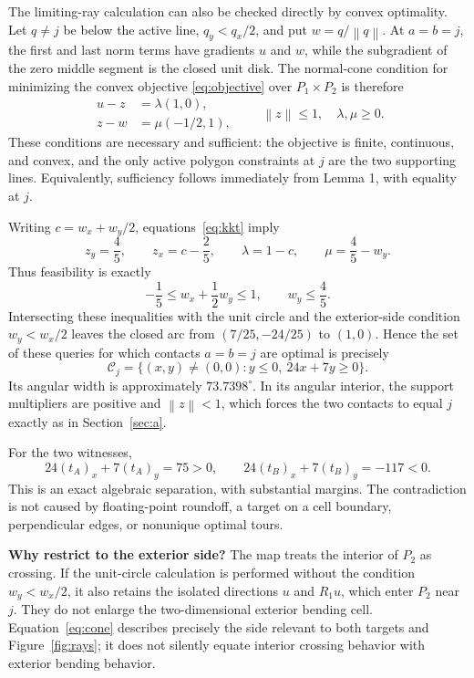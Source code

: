 \documentclass[11pt,a4paper]{article}
\newcommand{\norm}[1]{\left\lVert#1\right\rVert}
\begin{document}
The limiting-ray calculation can also be checked directly by convex optimality.
Let $q\neq j$ be below the active line, $q_y<q_x/2$, and put
$w=q/\norm{q}$. At $a=b=j$, the first and last norm terms have gradients $u$
and $w$, while the subgradient of the zero middle segment is the closed unit
disk. The normal-cone condition for minimizing the convex objective
\eqref{eq:objective} over $P_1\times P_2$ is therefore
\begin{equation}
 \begin{split}
 u-z&=\lambda(1,0),\\
 z-w&=\mu(-1/2,1),
 \end{split}
 \qquad \norm{z}\leq1,\quad \lambda,\mu\geq0.
 \label{eq:kkt}
\end{equation}
These conditions are necessary and sufficient: the objective is finite,
continuous, and convex, and the only active polygon constraints at $j$ are the
two supporting lines. Equivalently, sufficiency follows immediately from
Lemma 1, with equality at $j$.

Writing $c=w_x+w_y/2$, equations~\eqref{eq:kkt} imply
\begin{equation}
 z_y=\frac45,\qquad z_x=c-\frac25,\qquad
 \lambda=1-c,\qquad\mu=\frac45-w_y.
\end{equation}
Thus feasibility is exactly
\begin{equation}
 -\frac15\leq w_x+\frac12w_y\leq1,\qquad w_y\leq\frac45.
 \label{eq:unit-conditions}
\end{equation}
Intersecting these inequalities with the unit circle and the exterior-side
condition $w_y<w_x/2$ leaves the closed arc from
$(7/25,-24/25)$ to $(1,0)$. Hence the set of these queries for which contacts
$a=b=j$ are optimal is precisely
\begin{equation}
 \boxed{\mathcal C_j=\{(x,y)\neq(0,0):y\leq0,\ 24x+7y\geq0\}}.
 \label{eq:cone}
\end{equation}
Its angular width is approximately $73.7398^\circ$. In its angular interior,
the support multipliers are positive and $\norm{z}<1$, which forces the two
contacts to equal $j$ exactly as in Section~\ref{sec:a}.

For the two witnesses,
\[
 24(t_A)_x+7(t_A)_y=75>0,\qquad
 24(t_B)_x+7(t_B)_y=-117<0.
\]
This is an exact algebraic separation, with substantial margins. The
contradiction is not caused by floating-point roundoff, a target on a cell
boundary, perpendicular edges, or nonunique optimal tours.

\textbf{Why restrict to the exterior side?} The map treats the interior of
$P_2$ as crossing. If the unit-circle calculation is performed without the
condition $w_y<w_x/2$, it also retains the isolated directions $u$ and $R_1u$,
which enter $P_2$ near $j$. They do not enlarge the two-dimensional exterior
bending cell. Equation~\eqref{eq:cone} describes precisely the side relevant
to both targets and Figure~\ref{fig:rays}; it does not silently equate interior
crossing behavior with exterior bending behavior.
\end{document}
